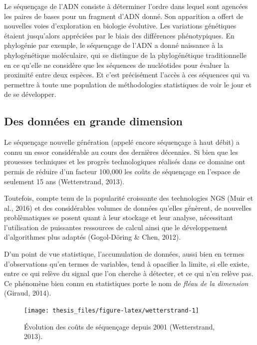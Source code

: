 \documentclass[12pt,a4paper,twoside]{ugathesis}
\theoremstyle{definition}
\theoremstyle{definition}
\theoremstyle{remark}
\begin{document}
Le séquençage de l'ADN consiste à déterminer l'ordre dans lequel sont
agencées les paires de bases pour un fragment d'ADN donné. Son
apparition a offert de nouvelles voies d'exploration en biologie
évolutive. Les variations génétiques étaient jusqu'alors appréciées par
le biais des différences phénotypiques. En phylogénie par exemple, le
séquençage de l'ADN a donné naissance à la phylogénétique moléculaire,
qui se distingue de la phylogénétique traditionnelle en ce qu'elle ne
considère que les séquences de nucléotides pour évaluer la proximité
entre deux espèces. Et c'est précisément l'accès à ces séquences qui va
permettre à toute une population de méthodologies statistiques de voir
le jour et de se développer.

\subsection{Des données en grande
dimension}\label{des-donnees-en-grande-dimension}

Le séquençage nouvelle génération (appelé encore séquençage à haut
débit) a connu un essor considérable au cours des dernières décennies.
Si bien que les prouesses techniques et les progrès technologiques
réalisés dans ce domaine ont permis de réduire d'un facteur 100,000 les
coûts de séquençage en l'espace de seulement 15 ans (Wetterstrand,
2013).

Toutefois, compte tenu de la popularité croissante des technologies NGS
(Muir et al., 2016) et des considérables volumes de données qu'elles
génèrent, de nouvelles problèmatiques se posent quant à leur stockage et
leur analyse, nécessitant l'utilisation de puissantes ressources de
calcul ainsi que le développement d'algorithmes plus adaptés
(Gogol-Döring \& Chen, 2012).

D'un point de vue statistique, l'accumulation de données, aussi bien en
termes d'observations qu'en termes de variables, tend à opacifier la
limite, si elle existe, entre ce qui relève du signal que l'on cherche à
détecter, et ce qui n'en relève pas. Ce phénomène bien connu en
statistiques porte le nom de \emph{fléau de la dimension} (Giraud,
2014).



\begin{figure}

{\centering \texttt{[image: thesis\_files/figure-latex/wetterstrand-1]} 

}

\caption{Évolution des coûts de séquençage depuis 2001
(Wetterstrand, 2013).}\label{fig:wetterstrand}
\end{figure}
\end{document}
